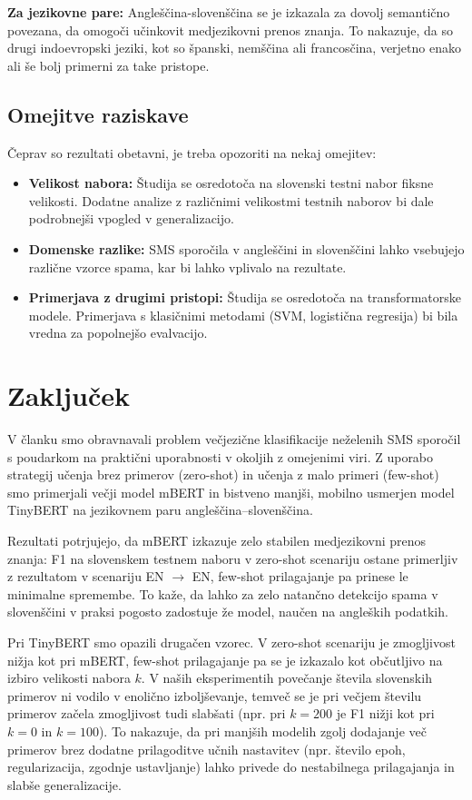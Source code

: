 \documentclass[sigconf,nonacm]{acmart}
\begin{document}
\textbf{Za jezikovne pare:} Angleščina-slovenščina se je izkazala za dovolj semantično povezana, da omogoči učinkovit medjezikovni prenos znanja. To nakazuje, da so drugi indoevropski jeziki, kot so španski, nemščina ali francosčina, verjetno enako ali še bolj primerni za take pristope.

\subsection{Omejitve raziskave}

Čeprav so rezultati obetavni, je treba opozoriti na nekaj omejitev:

\begin{itemize}
    \item \textbf{Velikost nabora:} Študija se osredotoča na slovenski testni nabor fiksne velikosti. Dodatne analize z različnimi velikostmi testnih naborov bi dale podrobnejši vpogled v generalizacijo.
    \item \textbf{Domenske razlike:} SMS sporočila v angleščini in slovenščini lahko vsebujejo različne vzorce spama, kar bi lahko vplivalo na rezultate.
    \item \textbf{Primerjava z drugimi pristopi:} Študija se osredotoča na transformatorske modele. Primerjava s klasičnimi metodami (SVM, logistična regresija) bi bila vredna za popolnejšo evalvacijo.
\end{itemize}

\section{Zaključek}

V članku smo obravnavali problem večjezične klasifikacije neželenih SMS sporočil s poudarkom na praktični uporabnosti v okoljih z omejenimi viri. Z uporabo strategij učenja brez primerov (zero-shot) in učenja z malo primeri (few-shot) smo primerjali večji model mBERT in bistveno manjši, mobilno usmerjen model TinyBERT na jezikovnem paru angleščina--slovenščina.

Rezultati potrjujejo, da mBERT izkazuje zelo stabilen medjezikovni prenos znanja: F1 na slovenskem testnem naboru v zero-shot scenariju ostane primerljiv z rezultatom v scenariju EN $\rightarrow$ EN, few-shot prilagajanje pa prinese le minimalne spremembe. To kaže, da lahko za zelo natančno detekcijo spama v slovenščini v praksi pogosto zadostuje že model, naučen na angleških podatkih.

Pri TinyBERT smo opazili drugačen vzorec. V zero-shot scenariju je zmogljivost nižja kot pri mBERT, few-shot prilagajanje pa se je izkazalo kot občutljivo na izbiro velikosti nabora $k$. V naših eksperimentih povečanje števila slovenskih primerov ni vodilo v enolično izboljševanje, temveč se je pri večjem številu primerov začela zmogljivost tudi slabšati (npr. pri $k=200$ je F1 nižji kot pri $k=0$ in $k=100$). To nakazuje, da pri manjših modelih zgolj dodajanje več primerov brez dodatne prilagoditve učnih nastavitev (npr. število epoh, regularizacija, zgodnje ustavljanje) lahko privede do nestabilnega prilagajanja in slabše generalizacije.
\end{document}

